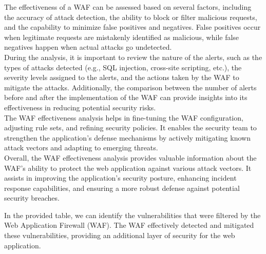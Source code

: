 \documentclass[12pt]{article}
\begin{document}
The effectiveness of a WAF can be assessed based on several factors, including the accuracy of attack detection, the ability to block or filter malicious requests, and the capability to minimize false positives and negatives. False positives occur when legitimate requests are mistakenly identified as malicious, while false negatives happen when actual attacks go undetected.\\

During the analysis, it is important to review the nature of the alerts, such as the types of attacks detected (e.g., SQL injection, cross-site scripting, etc.), the severity levels assigned to the alerts, and the actions taken by the WAF to mitigate the attacks. Additionally, the comparison between the number of alerts before and after the implementation of the WAF can provide insights into its effectiveness in reducing potential security risks.\\

The WAF effectiveness analysis helps in fine-tuning the WAF configuration, adjusting rule sets, and refining security policies. It enables the security team to strengthen the application's defense mechanisms by actively mitigating known attack vectors and adapting to emerging threats.\\

Overall, the WAF effectiveness analysis provides valuable information about the WAF's ability to protect the web application against various attack vectors. It assists in improving the application's security posture, enhancing incident response capabilities, and ensuring a more robust defense against potential security breaches.\\

\newpage

In the provided table, we can identify the vulnerabilities that were filtered by the Web Application Firewall (WAF). The WAF effectively detected and mitigated these vulnerabilities, providing an additional layer of security for the web application.\\
\end{document}
